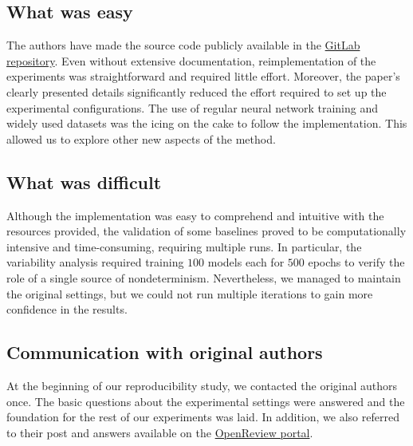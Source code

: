 \subsection*{What was easy}

The authors have made the source code publicly available in the \href{https://github.com/ceciliaresearch/nondeterminism_instability}{GitLab repository}. Even without extensive documentation, reimplementation of the experiments was straightforward and required little effort. Moreover, the paper's clearly presented details significantly reduced the effort required to set up the experimental configurations. The use of regular neural network training and widely used datasets was the icing on the cake to follow the implementation. This allowed us to explore other new aspects of the method.

\subsection*{What was difficult}

Although the implementation was easy to comprehend and intuitive with the resources provided, the validation of some baselines proved to be computationally intensive and time-consuming, requiring multiple runs. In particular, the variability analysis required training $100$ models each for $500$ epochs to verify the role of a single source of nondeterminism. Nevertheless, we managed to maintain the original settings, but we could not run multiple iterations to gain more confidence in the results.

\subsection*{Communication with original authors}

At the beginning of our reproducibility study, we contacted the original authors once. The basic questions about the experimental settings were answered and the foundation for the rest of our experiments was laid. In addition, we also referred to their post and answers available on the \href{https://openreview.net/forum?id=SQ7EHTDyn9Y}{OpenReview portal}.

\newpage


